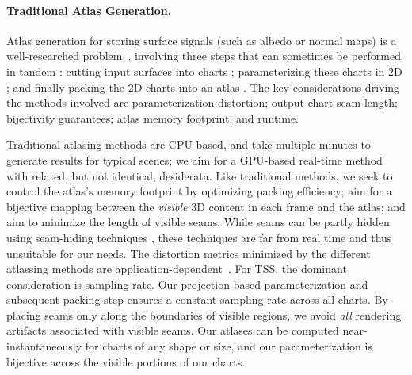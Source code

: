 \paragraph*{Traditional Atlas Generation.}
Atlas generation for storing surface signals (such as albedo or normal maps) is a well-researched problem~\cite{sheffer2007mesh}, involving three steps that can sometimes be performed in tandem \cite{BoundedDistortParam:2002,Li:2018:OptCuts}: cutting input surfaces into charts \cite{julius2005d,zhou2004iso}; parameterizing these charts in 2D \cite{levy2002least,sheffer2005abf++,jiang2017simplicial}; and finally packing the 2D charts into an atlas \cite{levy2002least,Limper18BoxCutter,igarashi2001adaptive,liu2019atlas}. The key considerations driving the methods involved are parameterization distortion; output chart seam length; bijectivity guarantees; atlas memory footprint; and runtime.
 
Traditional atlasing methods are CPU-based, and take multiple minutes to generate results for typical scenes; we aim for a GPU-based real-time method with related, but not identical, desiderata. Like traditional methods, we seek to control the atlas's memory footprint by optimizing packing efficiency; aim for a bijective mapping between the {\em visible} 3D content in each frame and the atlas; and aim to minimize the length of visible seams.  While seams can be partly hidden using seam-hiding techniques \cite{liu2017seamless,Ray2010invisible}, these techniques are far from real time and thus unsuitable for our needs. The distortion metrics minimized by the different atlassing methods are application-dependent~\cite{sheffer2007mesh,sander2002signal,sander2001texture}. For TSS, the dominant consideration is sampling rate. Our projection-based parameterization and subsequent packing step ensures a constant sampling rate across all charts. By placing seams only along the boundaries of visible regions, we avoid {\em all} rendering artifacts associated with visible seams. Our atlases can be computed near-instantaneously for charts of any shape or size, and our parameterization is bijective across the visible portions of our charts.

